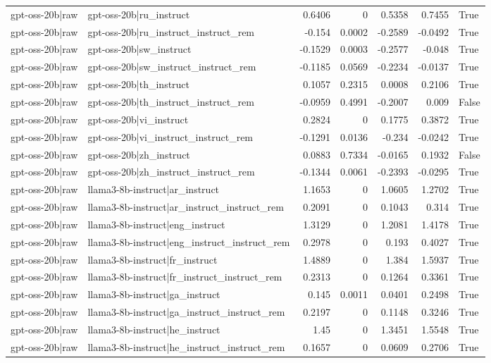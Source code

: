 \begin{table}
\begin{tabular}{l l r r r r l}
gpt-oss-20b|raw & gpt-oss-20b|ru_instruct & 0.6406 & 0 & 0.5358 & 0.7455 & True \\
gpt-oss-20b|raw & gpt-oss-20b|ru_instruct_instruct_rem & -0.154 & 0.0002 & -0.2589 & -0.0492 & True \\
gpt-oss-20b|raw & gpt-oss-20b|sw_instruct & -0.1529 & 0.0003 & -0.2577 & -0.048 & True \\
gpt-oss-20b|raw & gpt-oss-20b|sw_instruct_instruct_rem & -0.1185 & 0.0569 & -0.2234 & -0.0137 & True \\
gpt-oss-20b|raw & gpt-oss-20b|th_instruct & 0.1057 & 0.2315 & 0.0008 & 0.2106 & True \\
gpt-oss-20b|raw & gpt-oss-20b|th_instruct_instruct_rem & -0.0959 & 0.4991 & -0.2007 & 0.009 & False \\
gpt-oss-20b|raw & gpt-oss-20b|vi_instruct & 0.2824 & 0 & 0.1775 & 0.3872 & True \\
gpt-oss-20b|raw & gpt-oss-20b|vi_instruct_instruct_rem & -0.1291 & 0.0136 & -0.234 & -0.0242 & True \\
gpt-oss-20b|raw & gpt-oss-20b|zh_instruct & 0.0883 & 0.7334 & -0.0165 & 0.1932 & False \\
gpt-oss-20b|raw & gpt-oss-20b|zh_instruct_instruct_rem & -0.1344 & 0.0061 & -0.2393 & -0.0295 & True \\
gpt-oss-20b|raw & llama3-8b-instruct|ar_instruct & 1.1653 & 0 & 1.0605 & 1.2702 & True \\
gpt-oss-20b|raw & llama3-8b-instruct|ar_instruct_instruct_rem & 0.2091 & 0 & 0.1043 & 0.314 & True \\
gpt-oss-20b|raw & llama3-8b-instruct|eng_instruct & 1.3129 & 0 & 1.2081 & 1.4178 & True \\
gpt-oss-20b|raw & llama3-8b-instruct|eng_instruct_instruct_rem & 0.2978 & 0 & 0.193 & 0.4027 & True \\
gpt-oss-20b|raw & llama3-8b-instruct|fr_instruct & 1.4889 & 0 & 1.384 & 1.5937 & True \\
gpt-oss-20b|raw & llama3-8b-instruct|fr_instruct_instruct_rem & 0.2313 & 0 & 0.1264 & 0.3361 & True \\
gpt-oss-20b|raw & llama3-8b-instruct|ga_instruct & 0.145 & 0.0011 & 0.0401 & 0.2498 & True \\
gpt-oss-20b|raw & llama3-8b-instruct|ga_instruct_instruct_rem & 0.2197 & 0 & 0.1148 & 0.3246 & True \\
gpt-oss-20b|raw & llama3-8b-instruct|he_instruct & 1.45 & 0 & 1.3451 & 1.5548 & True \\
gpt-oss-20b|raw & llama3-8b-instruct|he_instruct_instruct_rem & 0.1657 & 0 & 0.0609 & 0.2706 & True \\

\end{tabular}
\end{table}
